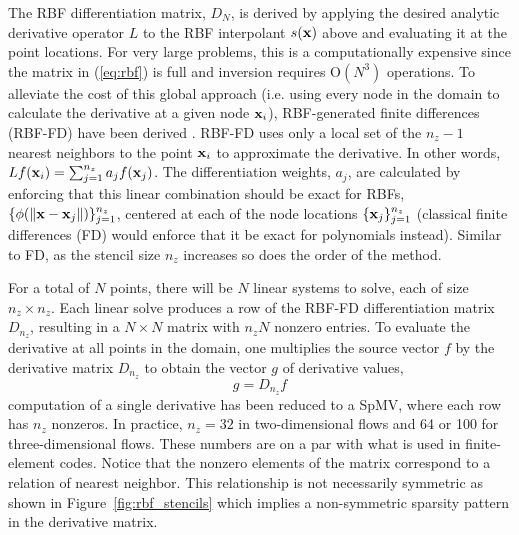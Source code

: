 \documentclass[10pt,conference,compsocconf]{IEEEtran}
\begin{document}
The RBF differentiation matrix, $D_N$, is derived by applying the
desired analytic derivative operator $L$ to the RBF interpolant
$s({\bf x})$ above and evaluating it at the point locations. For very
large problems, this is a computationally expensive since the matrix
in (\ref{eq:rbf}) is full and inversion requires O$(N^3)$
operations. To alleviate the cost of this global approach (i.e. using
every node in the domain to calculate the derivative at a given node
${\bf x}_i$), RBF-generated finite differences (RBF-FD) have been
derived \cite{TAI1,TAI2,SDY02,WrFo06,FoL11,FLBWSC12}. RBF-FD uses only
a local set of the $n_z-1$ nearest neighbors to the point ${\bf x}_i$ to
approximate the derivative. In other words,
$Lf({\bf x}_i)=\sum_{j=1}^{n_z}a_jf({\bf x}_j)$. The differentiation
weights, $a_j$, are calculated by enforcing that this linear
combination should be exact for RBFs,
$\{\phi(\|{\bf x}-{\bf x}_{j}\|)\}_{j=1}^{n_z}$, centered at each of the
node locations $\{{\bf x}_j\}_{j=1}^{n_z}$ (classical finite differences
(FD) would enforce that it be exact for polynomials instead). Similar
to FD, as the stencil size $n_z$ increases so does the order of the
method.

For a total of $N$ points, there will be $N$ linear systems to solve,
each of size $n_z \times n_z$. Each linear solve produces a row of the
RBF-FD differentiation matrix $D_{n_z}$, resulting in a $N \times N$
matrix with $n_zN$ nonzero entries. To evaluate the derivative at all
points in the domain, one multiplies the source vector $f$ by the 
derivative matrix $D_{n_z}$ to obtain the vector $g$ of derivative values, 
$$
  g = D_{n_z} f
$$
computation of a single derivative has been reduced to a SpMV, 
where each row has $n_z$ nonzeros. In
practice, $n_z=32$ in two-dimensional flows and 64 or 100 for
three-dimensional flows. These numbers are on a par with what is used in
finite-element codes. Notice that the nonzero elements of the matrix
correspond to a relation of nearest neighbor. This relationship is not
necessarily symmetric as shown in Figure~\ref{fig:rbf_stencils} which
implies a non-symmetric sparsity pattern in the derivative matrix. 
\end{document}
